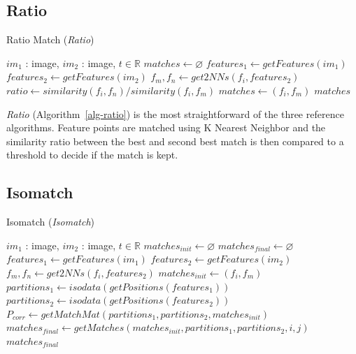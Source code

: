 \subsection{Ratio}

\begin{algorithm}[htb]
\caption{Ratio Match (\emph{Ratio})}
\label{alg-ratio}
\begin{algorithmic}
\Require $im_1$ : image, $im_2$ : image, $t \in \mathbb{R}$
\State $matches\gets \varnothing$
\State $features_1 \gets getFeatures(im_1)$
\State $features_2 \gets getFeatures(im_2)$
    \State $f_m,f_n \gets get2NNs(f_i, features_2)$
	\State $ratio \gets similarity(f_i, f_n) / similarity(f_i, f_m)$
        \State $matches \gets \left(f_i, f_m\right)$
	\EndIf
\EndFor
\Return $matches$
\end{algorithmic}
\end{algorithm}

\emph{Ratio} (Algorithm~\ref{alg-ratio}) \cite{lowe2004sift} is the most 
straightforward of the three reference algorithms. Feature points are 
matched using K Nearest Neighbor and the similarity ratio between the 
best and second best match is then compared to a threshold to decide if 
the match is kept.

\subsection{Isomatch}

\begin{algorithm}[h]
\caption{Isomatch (\emph{Isomatch})}
\label{alg-isomatch}
\begin{algorithmic}
\Require $im_1$ : image, $im_2$ : image, $t \in \mathbb{R}$
\State $matches_{init}\gets \varnothing$
\State $matches_{final}\gets \varnothing$
\State $features_1 \gets getFeatures(im_1)$
\State $features_2 \gets getFeatures(im_2)$
    \State $f_m,f_n \gets get2NNs(f_i, features_2)$
    \State $matches_{init} \gets \left(f_i, f_m\right)$
\EndFor
\State $partitions_1 \gets isodata(getPositions(features_1))$
\State $partitions_2 \gets isodata(getPositions(features_2))$
\State $P_{corr} \gets getMatchMat(partitions_1, partitions_2, 
matches_{init})$
        \State $matches_{final} \gets getMatches(matches_{init}, 
        partitions_1, partitions_2, i, j)$
    \EndIf
\EndFor
\Return $matches_{final}$
\end{algorithmic}
\end{algorithm}

